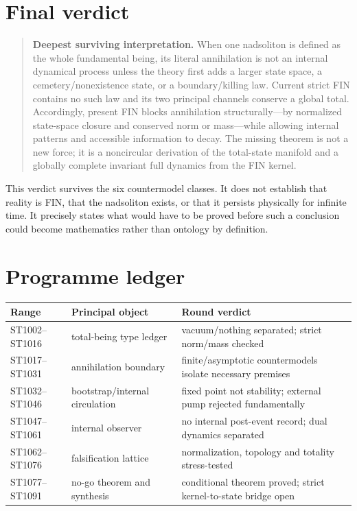 \documentclass[11pt,a4paper]{article}
\begin{document}
\section{Final verdict}

\begin{quote}
\textbf{Deepest surviving interpretation.}  When one nadsoliton is defined as
the whole fundamental being, its literal annihilation is not an internal
dynamical process unless the theory first adds a larger state space, a
cemetery/nonexistence state, or a boundary/killing law.  Current strict FIN
contains no such law and its two principal channels conserve a global total.
Accordingly, present FIN blocks annihilation structurally---by normalized
state-space closure and conserved norm or mass---while allowing internal
patterns and accessible information to decay.  The missing theorem is not a
new force; it is a noncircular derivation of the total-state manifold and a
globally complete invariant full dynamics from the FIN kernel.
\end{quote}

This verdict survives the six countermodel classes.  It does not establish
that reality is FIN, that the nadsoliton exists, or that it persists physically
for infinite time.  It precisely states what would have to be proved before
such a conclusion could become mathematics rather than ontology by
definition.

\appendix

\section{Programme ledger}

\begin{longtable}{@{}p{}p{}p{}@{}}
\toprule
Range & Principal object & Round verdict \\
\midrule\endhead
ST1002--ST1016 & total-being type ledger & vacuum/nothing separated; strict norm/mass checked \\
ST1017--ST1031 & annihilation boundary & finite/asymptotic countermodels isolate necessary premises \\
ST1032--ST1046 & bootstrap/internal circulation & fixed point not stability; external pump rejected fundamentally \\
ST1047--ST1061 & internal observer & no internal post-event record; dual dynamics separated \\
ST1062--ST1076 & falsification lattice & normalization, topology and totality stress-tested \\
ST1077--ST1091 & no-go theorem and synthesis & conditional theorem proved; strict kernel-to-state bridge open \\
\bottomrule
\end{longtable}
\end{document}
